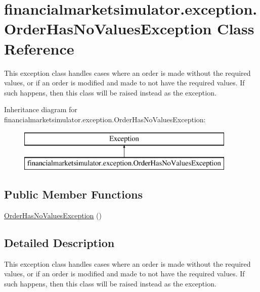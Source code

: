 \hypertarget{classfinancialmarketsimulator_1_1exception_1_1_order_has_no_values_exception}{\section{financialmarketsimulator.\+exception.\+Order\+Has\+No\+Values\+Exception Class Reference}
\label{classfinancialmarketsimulator_1_1exception_1_1_order_has_no_values_exception}
}


This exception class handles cases where an order is made without the required values, or if an order is modified and made to not have the required values. If such happens, then this class will be raised instead as the exception.  


Inheritance diagram for financialmarketsimulator.\+exception.\+Order\+Has\+No\+Values\+Exception\+:\begin{figure}[H]
\begin{center}
\leavevmode
\includegraphics[height=2.000000cm]{classfinancialmarketsimulator_1_1exception_1_1_order_has_no_values_exception}
\end{center}
\end{figure}
\subsection*{Public Member Functions}
\begin{DoxyCompactItemize}
\item 
\hyperlink{classfinancialmarketsimulator_1_1exception_1_1_order_has_no_values_exception_af6672136a398c1b03592f896fdfad5ea}{Order\+Has\+No\+Values\+Exception} ()
\end{DoxyCompactItemize}


\subsection{Detailed Description}
This exception class handles cases where an order is made without the required values, or if an order is modified and made to not have the required values. If such happens, then this class will be raised instead as the exception. 

